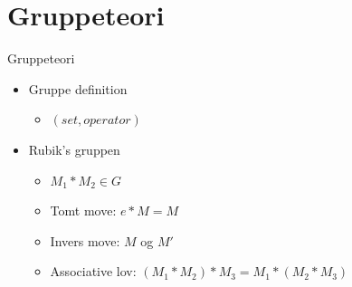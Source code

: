 \section{Gruppeteori}
\begin{frame}{Gruppeteori}
\begin{itemize}
	\item<1-> Gruppe definition 
	\begin{itemize}
		\item<1->  $(set,operator)$ 
	\end{itemize}
	\item<1-> Rubik's gruppen
	\begin{itemize}
		\item<1-> $M_1 * M_2 \in G$ 
		\item Tomt move: $e*M=M$
		\item Invers move: $M$ og $M'$
		\item Associative lov: $(M_1 * M_2) * M_3 = M_1 * (M_2 * M_3)$
	\end{itemize}
\end{itemize}
\end{frame}

